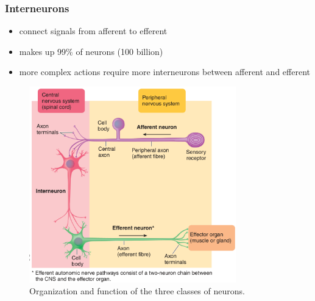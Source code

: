 \documentclass[10pt]{article}
\begin{document}
\subsubsection*{Interneurons}
\begin{itemize}
    \item connect signals from afferent to efferent
    \item makes up 99\% of neurons (100 billion)
    \item more complex actions require more interneurons between afferent and efferent
\end{itemize}
\begin{figure}[h]
    \centering
    \includegraphics[width=0.8\textwidth]{threeClassesofNeurons}
    \caption{Organization and function of the three classes of neurons.}
    \label{fig:threeClassesofNeurons}
\end{figure}
\end{document}
